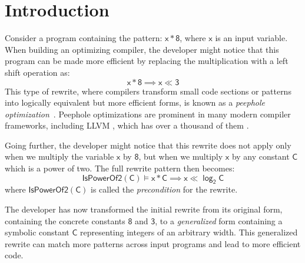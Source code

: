 \documentclass[review, anonymous, acmsmall]{acmart}
\newcommand{\blockmath}[1]{\[\mathsf{#1}\]}
\newcommand{\inline}[1]{$\mathsf{#1}$}
\begin{document}
\fi

\maketitle

\section{Introduction}
Consider a program containing the pattern: \inline{x * 8}, where \inline{x} is an input variable. When building an optimizing compiler, the developer might notice that this program can be made more efficient by replacing the multiplication with a left shift operation as:  
\[\mathsf{x * 8  \implies x \ll 3}\] 
This type of rewrite, where compilers transform small code sections or patterns into logically equivalent but more efficient forms, is known as a \textit{peephole optimization}~\cite{mckeemanPeephole1965}. Peephole optimizations are prominent in many modern compiler frameworks, including LLVM \cite{lattner_llvm_2004}, which has over a thousand of them \cite{menendez_termination-checking_2016}.  

Going further, the developer might notice that this rewrite does not apply only when we multiply the variable \inline{x} by \inline{8}, but when we multiply \inline{x} by any constant \inline{C} which is a power of two. The full rewrite pattern then becomes:
    \blockmath{IsPowerOf2(C) \models x * C \implies x \ll \log_2 C}
where $\mathsf{IsPowerOf2(C)}$ is called the \textit{precondition} for the rewrite. 

The developer has now transformed the initial rewrite from its original form, containing the concrete constants \inline{8} and \inline{3}, to a \textit{generalized} form containing a symbolic constant \inline{C} representing integers of an arbitrary width. This generalized rewrite can match more patterns across input programs and lead to more efficient code. 
\end{document}
